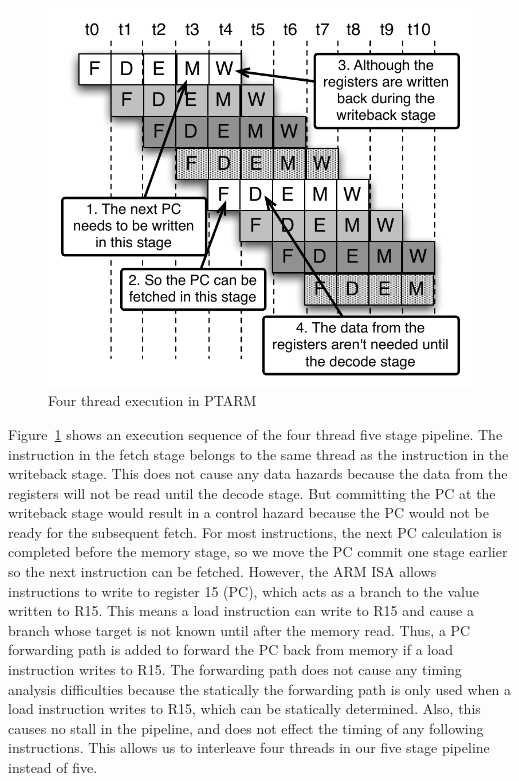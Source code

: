 \begin{figure}
  \vspace{-20pt}
  \begin{center}
    \includegraphics[scale=.65]{figs/four_thread_pipeline}
  \end{center}
  \vspace{-20pt}
  \caption{Four thread execution in PTARM}
  \label{fig:four_thread_pipeline}
  \vspace{-10pt}
\end{figure}      
Figure~\ref{fig:four_thread_pipeline} shows an execution sequence of the four thread five stage pipeline.
The instruction in the fetch stage belongs to the same thread as the instruction in the writeback stage.
This does not cause any data hazards because the data from the registers will not be read until the decode stage. 
But committing the PC at the writeback stage would result in a control hazard because the PC would not be ready for the subsequent fetch.
For most instructions, the next PC calculation is completed before the memory stage, so we move the PC commit one stage earlier so the next instruction can be fetched.
However, the ARM ISA allows instructions to write to register 15 (PC), which acts as a branch to the value written to R15.   
This means a load instruction can write to R15 and cause a branch whose target is not known until after the memory read.   
Thus, a PC forwarding path is added to forward the PC back from memory if a load instruction writes to R15.  
The forwarding path does not cause any timing analysis difficulties because the statically the forwarding path is only used when a load instruction writes to R15, which can be statically determined. 
Also, this causes no stall in the pipeline, and does not effect the timing of any following instructions. 
This allows us to interleave four threads in our five stage pipeline instead of five.    

